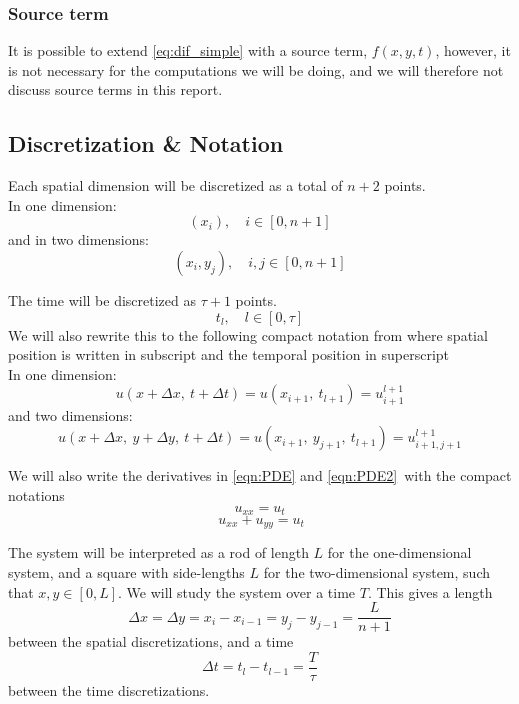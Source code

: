 \documentclass[10pt,a4paper]{article}
\newcommand{\dt}{{\Delta t}}
\newcommand{\dx}{{\Delta x}}
\newcommand{\dy}{{\Delta y}}
\begin{document}
\subsubsection{Source term}
It is possible to extend \vref{eq:dif_simple} with a source term, $f(x, y, t)$, however, it is not necessary for the computations we will be doing, and we will therefore not discuss source terms in this report.



\subsection{Discretization \& Notation}\label{sec:disc}
Each spatial dimension will be discretized as a total of $n+2$ points.\\
In one dimension:
\begin{equation} (x_i), \quad i \in [0,n+1] \end{equation}
and in two dimensions:
\begin{equation} (x_i, y_j), \quad i,j \in [0,n+1]\end{equation}

The time will be discretized as $\tau+1$ points.
\begin{equation} t_l, \quad l \in [0,\tau] \end{equation}
We will also rewrite this to the following compact notation from \cite{hpl_fdm} where spatial position is written in subscript and the temporal position in superscript \\
In one dimension:
\begin{equation}
u(x+\dx,\ t+\dt) = u(x_{i+1},\ t_{l+1}) = u_{i+1}^{l+1}
\end{equation}
and two dimensions:
\begin{equation}
u(x+\dx,\ y+\dy,\ t+\dt) = u(x_{i+1},\ y_{j+1},\ t_{l+1}) = u_{i+1,j+1}^{l+1}
\end{equation}


We will also write the derivatives in \ref{eqn:PDE} and \ref{eqn:PDE2} with the compact notations
\begin{equation} u_{xx} = u_t\end{equation}
\begin{equation} \ u_{xx} + u_{yy} = u_t \end{equation}

The system will be interpreted as a rod of length $L$ for the one-dimensional system, and a square with side-lengths $L$ for the two-dimensional system, such that $x,y \in [0,L]$. We will study the system over a time $T$. This gives a length
\begin{equation}
\dx = \dy = x_i - x_{i-1} = y_j - y_{j-1} = \frac{L}{n+1}
\end{equation}
between the spatial discretizations, and a time
\begin{equation}
\dt = t_l - t_{l-1} = \frac{T}{\tau}
\end{equation}
between the time discretizations.\\\\
\end{document}
